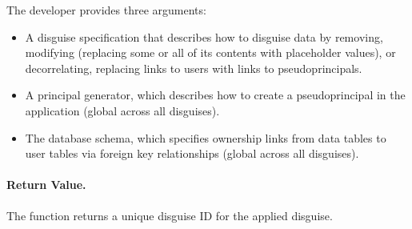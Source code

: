     The developer provides three arguments:
    \begin{itemize}
    \item A disguise specification that describes how to disguise data by
    removing, modifying (replacing some or all of its contents with placeholder
    values), or decorrelating, replacing links to users with links to
    pseudoprincipals.
    
    \item A principal generator, which describes how to create a
    pseudoprincipal in the application (global across all disguises).
    
    \item The database schema, which specifies ownership links from data tables to user
    tables via foreign key relationships (global across all disguises).
    \end{itemize}

    \paragraph{Return Value.} 
    The function returns a unique disguise ID for the applied disguise.



\iffalse
%
(1) An application registers users with a public--private keypair
that either the application or the user's client generates; \sys stores the
public key in its database, while the user retains the private key for use in
future reveal operations.
%

%
(2) When the application wants to \xx some data, it invokes \sys with the
corresponding developer-provided \xx specification and any necessary
parameters (such as a user ID).
%
\Xx specifications can remove data, modify data (replacing some or all of its
contents with placeholder values), or decorrelate data, replacing
links to users with links to pseudoprincipals (fake users).
%
%
\sys takes the data it removed or replaced and the connections between
the user and any pseudoprincipals it created, encrypts that data with the user's
public key, and stores the resulting ciphertext---the \emph{\xxed
data}---such that it cannot be linked back to the user without the user's
private key.
%
%


%
(4) When a user wishes to reveal their \xxed data, they pass credentials
to the application, which calls into \sys to reveal the data.
%
Credentials are application-specific: users may either provide their private
key or other credentials sufficient for \sys to re-derive the private key.
%
\sys reads the \xxed data and decrypts it, undoing the changes to the
application database that \xxing introduced.
%

%
\sys provides the developer with sensible default \xxing and revealing
semantics (\eg revealing makes sure not to overwrite changes made since
\xxing).
\fi
